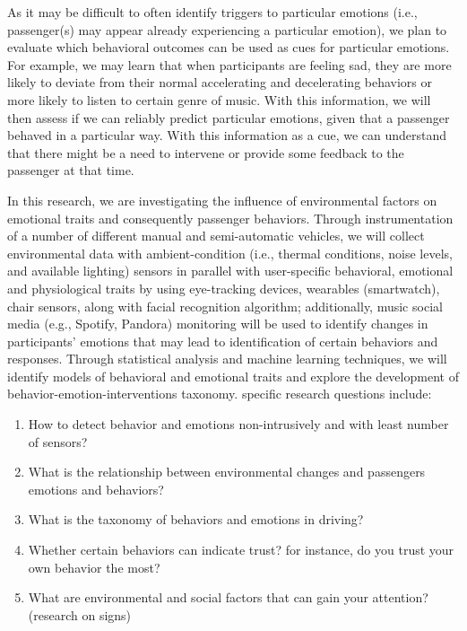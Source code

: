 As it may be difficult to often identify triggers to particular emotions (i.e., passenger(s) may appear already experiencing a particular emotion), we plan to evaluate which behavioral outcomes can be used as cues for particular emotions. For example, we may learn that when participants are feeling sad, they are more likely to deviate from their normal accelerating and decelerating behaviors or more likely to listen to certain genre of music. With this information, we will then assess if we can reliably predict particular emotions, given that a passenger behaved in a particular way. With this information as a cue, we can understand that there might be a need to intervene or provide some feedback to the passenger at that time. 


In this research, we are investigating the influence of environmental factors on emotional traits and consequently passenger behaviors. Through instrumentation of a number of different manual and semi-automatic vehicles, we will collect environmental data with ambient-condition (i.e., thermal conditions, noise levels, and available lighting) sensors in parallel with user-specific behavioral, emotional and physiological traits by using eye-tracking devices, wearables (smartwatch), chair sensors, along with facial recognition algorithm; additionally, music social media (e.g., Spotify, Pandora) monitoring will be used to identify changes in participants’ emotions that may lead to identification of certain behaviors and responses. Through statistical analysis and machine learning techniques, we will identify models of behavioral and emotional traits and explore the development of behavior-emotion-interventions taxonomy.  specific research questions include: 
\begin{enumerate}
    \item How to detect behavior and emotions non-intrusively and with least number of sensors?
    \item What is the relationship between environmental changes and passengers emotions and behaviors?
    \item What is the taxonomy of behaviors and emotions in driving?
    \item Whether certain behaviors can indicate trust? for instance, do you trust your own behavior the most? 
    \item What are environmental and social factors that can gain your attention? (research on signs)
\end{enumerate}



